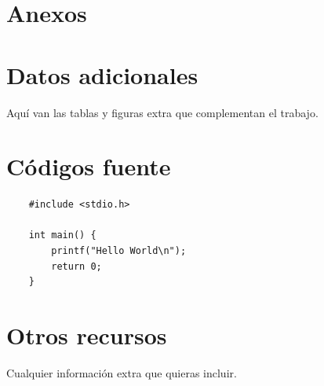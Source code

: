 \section*{\huge Anexos} \label{sec:anexos}

\section{Datos adicionales} \label{sec:anexo_datos_adicionales}
Aquí van las tablas y figuras extra que complementan el trabajo.

\section{Códigos fuente} \label{sec:codigos_fuente}
\begin{verbatim}
    #include <stdio.h>

    int main() {
        printf("Hello World\n");
        return 0;
    }
\end{verbatim}

\section{Otros recursos} \label{sec:otros_recursos}
Cualquier información extra que quieras incluir.